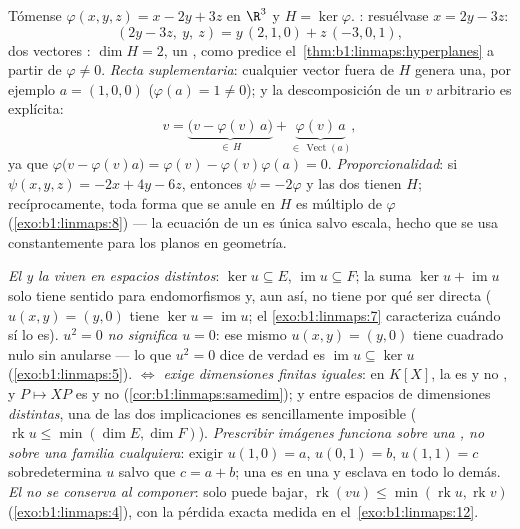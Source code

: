 \begin{example}
\label{ex:b1:linmaps:hyperplanerun}
Tómense $\varphi(x, y, z) = x - 2y + 3z$ en $\R^3$ y
$H = \ker\varphi$. \emph{}: resuélvase $x = 2y - 3z$:
\[
(2y - 3z,\ y,\ z) = y\,(2, 1, 0) + z\,(-3, 0, 1),
\]
dos vectores : $\dim H = 2$, un , como predice
el~\cref{thm:b1:linmaps:hyperplanes} a partir de $\varphi \neq 0$.
\emph{Recta suplementaria}: cualquier vector fuera de $H$ genera
una, por ejemplo $a = (1, 0, 0)$ ($\varphi(a) = 1 \neq 0$); y la
descomposición de un $v$ arbitrario es explícita:
\[
v = \underbrace{\bigl(v - \varphi(v)\,a\bigr)}_{\in\,H}
+ \underbrace{\varphi(v)\,a}_{\in\,\operatorname{Vect}(a)},
\]
ya que $\varphi\bigl(v - \varphi(v)a\bigr) = \varphi(v) -
\varphi(v)\varphi(a) = 0$. \emph{Proporcionalidad}: si
$\psi(x,y,z) = -2x + 4y - 6z$, entonces $\psi = -2\varphi$ y las dos
tienen  $H$; recíprocamente, toda forma que se anule en $H$
es múltiplo de $\varphi$ (\cref{exo:b1:linmaps:8}) --- la ecuación de
un  es única salvo escala, hecho que se usa
constantemente para los planos en geometría.
\end{example}

\begin{remark}
\label{rem:b1:linmaps:pitfalls}
\emph{El  y la  viven en espacios distintos}:
$\ker u \subseteq E$, $\operatorname{im} u \subseteq F$; la suma
$\ker u + \operatorname{im} u$ solo tiene sentido para
endomorfismos y, aun así, no tiene por qué ser directa
($u(x, y) = (y, 0)$ tiene $\ker u = \operatorname{im} u$; el
\cref{exo:b1:linmaps:7} caracteriza cuándo sí lo es).
\emph{$u^2 = 0$ no significa $u = 0$}: ese mismo $u(x,y) = (y, 0)$
tiene cuadrado nulo sin anularse --- lo que $u^2 = 0$ dice de verdad
es $\operatorname{im} u \subseteq \ker u$
(\cref{exo:b1:linmaps:5}).
\emph{ $\iff$  exige dimensiones finitas
iguales}: en $K[X]$, la  es  y no , y
$P \mapsto XP$ es  y no 
(\cref{cor:b1:linmaps:samedim}); y entre espacios de dimensiones
\emph{distintas}, una de las dos implicaciones es sencillamente
imposible ($\operatorname{rk} u \leq \min(\dim E, \dim F)$).
\emph{Prescribir imágenes funciona sobre una , no sobre una
familia cualquiera}: exigir $u(1, 0) = a$, $u(0, 1) = b$,
$u(1, 1) = c$ sobredetermina $u$ salvo que $c = a + b$; una
 es  en una  y esclava en todo lo demás.
\emph{El  no se conserva al componer}: solo puede bajar,
$\operatorname{rk}(vu) \leq \min(\operatorname{rk} u,
\operatorname{rk} v)$ (\cref{exo:b1:linmaps:4}), con la pérdida
exacta medida en el~\cref{exo:b1:linmaps:12}.
\end{remark}

